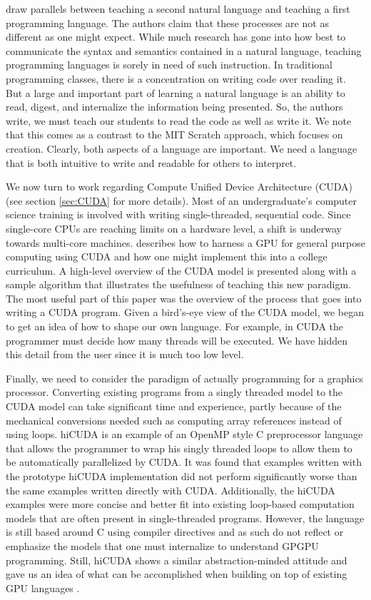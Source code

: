 \documentclass[twocolumn]{article}
\renewcommand{\|}{\origbar} %
\begin{document}
 draw parallels between teaching a second natural language and teaching a first programming language. The authors claim that these processes are not as different as one might expect. While much research has gone into how best to communicate the syntax and semantics contained in a natural language, teaching programming languages is sorely in need of such instruction. In traditional programming classes, there is a concentration on writing code over reading it. But a large and important part of learning a natural language is an ability to read, digest, and internalize the information being presented. So, the authors write, we must teach our students to read the code as well as write it. We note that this comes as a contrast to the MIT Scratch approach, which focuses on creation. Clearly, both aspects of a language are important. We need a language that is both intuitive to write and readable for others to interpret.

We now turn to work regarding Compute Unified Device Architecture (CUDA) (see section \ref{sec:CUDA} for more details). Most of an undergraduate's computer science training is involved with writing single-threaded, sequential code. Since single-core CPUs are reaching limits on a hardware level, a shift is underway towards multi-core machines.  describes how to harness a GPU for general purpose computing using CUDA and how one might implement this into a college curriculum. A high-level overview of the CUDA model is presented along with a sample algorithm that illustrates the usefulness of teaching this new paradigm. The most useful part of this paper was the overview of the process that goes into writing a CUDA program. Given a bird's-eye view of the CUDA model, we began to get an idea of how to shape our own language. For example, in CUDA the programmer must decide how many threads will be executed. We have hidden this detail from the user since it is much too low level.

Finally, we need to consider the paradigm of actually programming for a graphics processor. Converting existing programs from a singly threaded model to the CUDA model can take significant time and experience, partly because of the mechanical conversions needed such as computing array references instead of using loops. hiCUDA is an example of an OpenMP style C preprocessor language that allows the programmer to wrap his singly threaded loops to allow them to be automatically parallelized by CUDA. It was found that examples written with the prototype hiCUDA implementation did not perform significantly worse than the same examples written directly with CUDA. Additionally, the hiCUDA examples were more concise and better fit into existing loop-based computation models that are often present in single-threaded programs. However, the language is still based around C using compiler directives and as such do not reflect or emphasize the models that one must internalize to understand GPGPU programming. Still, hiCUDA shows a similar abstraction-minded attitude and gave us an idea of what can be accomplished when building on top of existing GPU languages \cite{han}.
\end{document}
